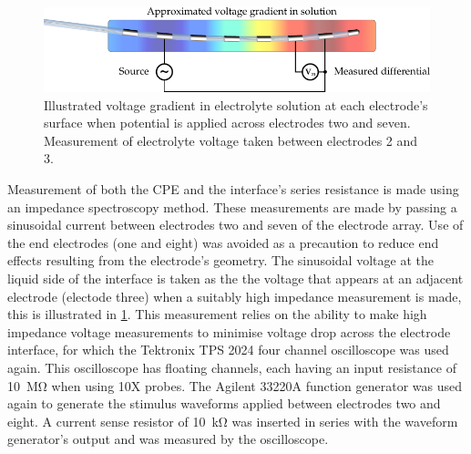      \begin{figure}
        \centering
        \includegraphics{content/pt2/08-InterfaceParameters/graphics/measurement_CPE}
        \caption{\label{fig:pt2-measurement_CPE}Illustrated voltage gradient in electrolyte solution at each electrode's surface when potential is applied across electrodes two and seven. Measurement of electrolyte voltage taken between electrodes 2 and 3.}
      \end{figure}
      Measurement of both the CPE and the interface's series resistance is made using an impedance spectroscopy method.
      These measurements are made by passing a sinusoidal current between electrodes two and seven of the electrode array.
      Use of the end electrodes (one and eight) was avoided as a precaution to reduce end effects resulting from the electrode's geometry.
      The sinusoidal voltage at the liquid side of the interface is taken as the the voltage that appears at an adjacent electrode (electode three) when a suitably high impedance measurement is made, this is illustrated in \cref{fig:pt2-measurement_CPE}.
      This measurement relies on the ability to make high impedance voltage measurements to minimise voltage drop across the electrode interface, for which the Tektronix TPS 2024 four channel oscilloscope was used again.
      This oscilloscope has floating channels, each having an input resistance of \SI{10}{\mega\ohm} when using 10X probes.
      The Agilent 33220A function generator was used again to generate the stimulus waveforms applied between electrodes two and eight.
      A current sense resistor of \SI{10}{\kilo\ohm} was inserted in series with the waveform generator's output and was measured by the oscilloscope.
